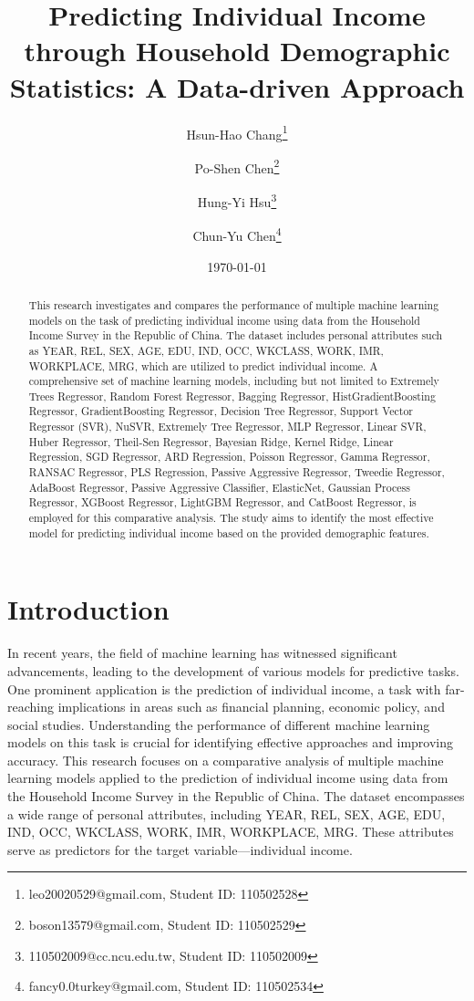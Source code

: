 \documentclass[twocolumn]{article}
\title{Predicting Individual Income through Household Demographic Statistics: A Data-driven Approach}
\author{
	Hsun-Hao Chang\thanks{leo20020529@gmail.com, Student ID: 110502528}\and 
	Po-Shen Chen\thanks{boson13579@gmail.com, Student ID: 110502529}\and 
	Hung-Yi Hsu\thanks{110502009@cc.ncu.edu.tw, Student ID: 110502009}\and 
	Chun-Yu Chen\thanks{fancy0.0turkey@gmail.com, Student ID: 110502534}
}
\date{\today}
\begin{document}
\begin{titlepage}
    \maketitle
    \thispagestyle{empty}
\end{titlepage}

\begin{abstract}
This research investigates and compares the performance of multiple machine learning models on the task of predicting individual income using data from the Household Income Survey in the Republic of China. The dataset includes personal attributes such as YEAR, REL, SEX, AGE, EDU, IND, OCC, WKCLASS, WORK, IMR, WORKPLACE, MRG, which are utilized to predict individual income. A comprehensive set of machine learning models, including but not limited to Extremely Trees Regressor, Random Forest Regressor, Bagging Regressor, HistGradientBoosting Regressor, GradientBoosting Regressor, Decision Tree Regressor, Support Vector Regressor (SVR), NuSVR, Extremely Tree Regressor, MLP Regressor, Linear SVR, Huber Regressor, Theil-Sen Regressor, Bayesian Ridge, Kernel Ridge, Linear Regression, SGD Regressor, ARD Regression, Poisson Regressor, Gamma Regressor, RANSAC Regressor, PLS Regression, Passive Aggressive Regressor, Tweedie Regressor, AdaBoost Regressor, Passive Aggressive Classifier, ElasticNet, Gaussian Process Regressor, XGBoost Regressor, LightGBM Regressor, and CatBoost Regressor, is employed for this comparative analysis. The study aims to identify the most effective model for predicting individual income based on the provided demographic features.
\end{abstract}

\section{Introduction}
In recent years, the field of machine learning has witnessed significant advancements, leading to the development of various models for predictive tasks. One prominent application is the prediction of individual income, a task with far-reaching implications in areas such as financial planning, economic policy, and social studies. Understanding the performance of different machine learning models on this task is crucial for identifying effective approaches and improving accuracy.
This research focuses on a comparative analysis of multiple machine learning models applied to the prediction of individual income using data from the Household Income Survey in the Republic of China. The dataset encompasses a wide range of personal attributes, including YEAR, REL, SEX, AGE, EDU, IND, OCC, WKCLASS, WORK, IMR, WORKPLACE, MRG. These attributes serve as predictors for the target variable—individual income.
\end{document}
